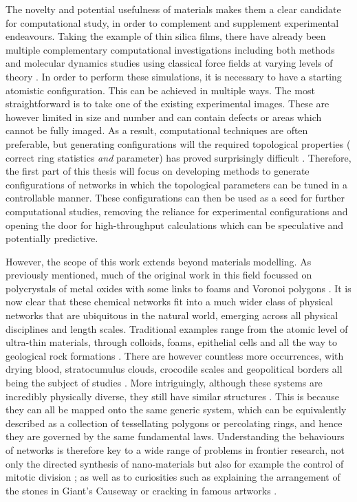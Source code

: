 The novelty and potential usefulness of \td{} materials makes them a  clear candidate for computational study, in order to complement and supplement experimental endeavours. 
Taking the example of thin silica films, there have already been multiple complementary computational investigations including both \abinitio{} methods and molecular dynamics studies using classical force fields at varying levels of theory \cite{Bjorkman2013,Malashevich2016,Wilson2013,Wilson2018,Zhang2018a,Bamer2019,Roy2019,Richter2019}.
In order to perform these simulations, it is necessary to have a starting atomistic configuration.
This can be achieved in multiple ways. 
The most straightforward is to take one of the existing experimental images. 
These are however limited in size and number and can contain defects or areas which cannot be fully imaged.
As a result, computational techniques are often preferable, but generating configurations will the required topological properties (\ie{} correct ring statistics \textit{and} \aw{} parameter) has proved surprisingly difficult \cite{Roy2018,Kumar2014}.
Therefore, the first part of this thesis will focus on developing methods to generate configurations of \td{} networks in which the topological parameters can be tuned in a controllable manner.
These configurations can then be used as a seed for further computational studies, removing the reliance for experimental configurations and opening the door for high\--throughput calculations which can be speculative and potentially predictive.

However, the scope of this work extends beyond materials modelling.
As previously mentioned, much of the original work in this field focussed on polycrystals of metal oxides with some links to foams and Voronoi polygons \cite{Aboav1980,Boots1984}.
It is now clear that these chemical networks fit into a much wider class of \td{} physical networks that are ubiquitous in the natural world, emerging across all physical disciplines and length scales.
Traditional examples range from the atomic level of ultra\--thin materials, through colloids, foams, epithelial cells and all the way to geological rock formations \cite{Earnshaw1994,Allain1995,Moncho-Jorda2000,Durand2011,Tong2017,Goehring2014}.
There are however countless more occurrences, with drying blood, stratocumulus clouds, crocodile scales and geopolitical borders all being the subject of studies \cite{Brutin2011,Glassmeier2017,Milinkovitch2019,LeCaer1993}.
More intriguingly, although these systems are incredibly physically diverse, they still have similar structures \cite{Schliecker1999}. 
This is because they can all be mapped onto the same generic system, which can be equivalently described as a collection of tessellating polygons or percolating rings, and hence they are governed by the same fundamental laws. 
Understanding the behaviours of \td{} networks is therefore key to a wide range of problems in frontier research, not only the directed synthesis of nano\--materials but also for example the control of mitotic division \cite{Gibson2011,Ladan2019}; as well as to curiosities such as explaining the arrangement of the stones in Giant's Causeway or cracking in famous artworks \cite{Weaire1984,Flores2017}.

